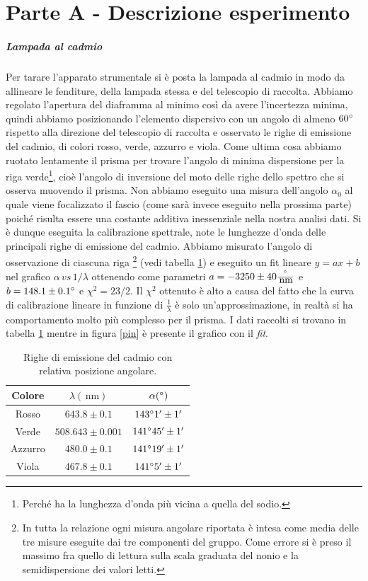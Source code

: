 \documentclass[10pt,a4paper]{article}
\begin{document}
\section{Parte A - Descrizione esperimento}
\subparagraph{Lampada al cadmio}
Per tarare l'apparato strumentale si è posta la lampada al cadmio in modo da allineare le fenditure, della lampada stessa e del telescopio di raccolta. Abbiamo regolato l'apertura del diaframma al minimo così da avere l'incertezza minima, quindi abbiamo posizionando l'elemento dispersivo con un angolo di almeno $60\degree$ rispetto alla direzione del telescopio di raccolta e osservato le righe di emissione del cadmio, di colori rosso, verde, azzurro e viola. Come ultima cosa abbiamo ruotato lentamente il prisma per trovare l'angolo di minima dispersione per la riga verde\footnote{Perché ha la lunghezza d'onda più vicina a quella del sodio.}, cioè l'angolo di inversione del moto delle righe dello spettro che si osserva muovendo il prisma. Non abbiamo eseguito una misura dell'angolo $\alpha_0$ al quale viene focalizzato il fascio (come sarà invece eseguito nella prossima parte) poiché risulta essere una costante additiva inessenziale nella nostra analisi dati.
Si è dunque eseguita la calibrazione spettrale, note le lunghezze d'onda delle principali righe di emissione del cadmio. Abbiamo misurato l'angolo di osservazione di ciascuna riga \footnote{In tutta la relazione ogni misura angolare riportata è intesa come media delle tre misure eseguite dai tre componenti del gruppo. Come errore si è preso il massimo fra quello di lettura sulla scala graduata del nonio e la semidispersione dei valori letti.} (vedi tabella \ref{cadmio}) e eseguito un fit lineare $y=ax+b$ nel grafico $\alpha\, \textit{vs}\, 1/\lambda$ ottenendo come parametri $a = -3250 \pm 40 \frac{\degree}{\,\mbox{nm}}$ e $ b = 148.1 \pm 0.1 \degree$ e $\chi^2=23/2$. Il $\chi^2$ ottenuto è alto a causa del fatto che la curva di calibrazione lineare in funzione di $\frac{1}{\lambda}$ è solo un'approssimazione, in realtà si ha comportamento molto più complesso per il prisma. I dati raccolti si trovano in tabella \ref{cadmio} mentre in figura \ref{pin} è presente il grafico con il \emph{fit}.

\begin{table}[!htb]
\centering
\begin{tabular}{|c|c|c|}
\hline 
Colore & $\lambda (\,\mbox{nm})$ & $\alpha (\degree)$ \\
\hline
Rosso & $643.8\pm0.1$ & $143 \degree 1' \pm 1'$ \\ 
\hline 
Verde & $508.643 \pm 0.001$ & $141 \degree 45' \pm 1'$ \\ 
\hline 
Azzurro & $480.0 \pm 0.1$ & $141 \degree 19' \pm 1'$ \\ 
\hline 
Viola & $467.8 \pm 0.1$	& $141 \degree 5' \pm 1'$ \\ 
\hline 
\end{tabular} 
\caption{Righe di emissione del cadmio con relativa posizione angolare.}\label{cadmio}
\end{table}
\end{document}
